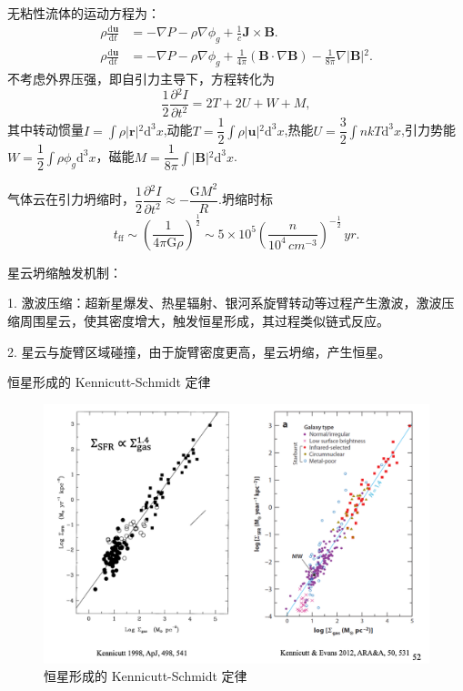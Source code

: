 \documentclass[../天体物理基础.tex]{subfiles}
\begin{document}
无粘性流体的运动方程为：
\begin{align}
\rho\frac{\mathrm{d}\boldsymbol{u}}{\mathrm{d}t}&=-\nabla{}P-\rho\nabla\phi_{g}+\frac{1}{c}\boldsymbol{J}\times\boldsymbol{B}.\\
\rho\frac{\mathrm{d}\boldsymbol{u}}{\mathrm{d}t}&=-\nabla P-\rho\nabla\phi_{g}+\frac{1}{4\pi}\left(\boldsymbol{B}\cdot\nabla \boldsymbol{B}\right)-\frac{1}{8\pi}\nabla{}\left\vert{}\boldsymbol{B}\right\vert{}^{2}.
\end{align}
不考虑外界压强，即自引力主导下，方程转化为
\begin{equation}
\frac{1}{2}\frac{\partial{}^{2}I}{\partial{}t^{2}}=2T+2U+W+M,
\end{equation}
其中转动惯量$I=\int\rho\left\vert{}\boldsymbol{r}\right\vert{}^{2}\mathrm{d}^{3}x$,动能$T=\dfrac{1}{2}\int\rho\left\vert{}\boldsymbol{u}\right\vert{}^2\mathrm{d}^{3}x$,热能$U=\dfrac{3}{2}\int nkT\mathrm{d}^3x$,引力势能$W=\dfrac{1}{2}\int\rho\phi_{g}\mathrm{d}^{3}x$，磁能$M=\dfrac{1}{8\pi}\int\left\vert{}\boldsymbol{B}\right\vert{}^{2}\mathrm{d}^{3}x$.

气体云在引力坍缩时，$\dfrac{1}{2}\dfrac{\partial{}^{2}I}{\partial{}t^{2}}\approx-\dfrac{\mathrm{G}M^{2}}{R}$.坍缩时标
\begin{equation}
t_{\text{ff}}\sim\left(\frac{1}{4\pi{}\mathrm{G}\rho}\right)^{\frac{1}{2}}\sim5\times10^{5}\left(\frac{n}{10^{4}\,\unit{cm^{-3}}}\right)^{-\frac{1}{2}}\,\unit{yr}.
\end{equation}

星云坍缩触发机制：

1. 激波压缩：超新星爆发、热星辐射、银河系旋臂转动等过程产生激波，激波压缩周围星云，使其密度增大，触发恒星形成，其过程类似链式反应。

2. 星云与旋臂区域碰撞，由于旋臂密度更高，星云坍缩，产生恒星。

恒星形成的 Kennicutt-Schmidt 定律
\begin{figure}[!htbp]
\centering
\includegraphics[width=13cm]{figures/figure3_2.png}
\captionsetup{justification=raggedright, singlelinecheck=false}
\caption{恒星形成的 Kennicutt-Schmidt 定律}
\label{}
\end{figure}
\end{document}
